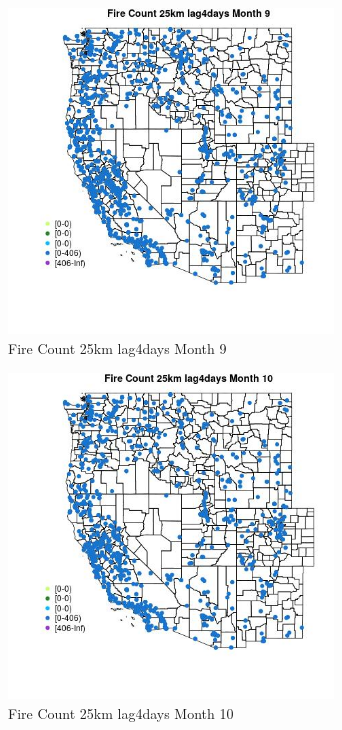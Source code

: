 \begin{figure} 
\centering  
\includegraphics[width=0.77\textwidth]{Code_Outputs/Report_ML_input_PM25_Step4_part_f_de_duplicated_aves_prioritize_24hr_obswNAs_MapObsMo9Fire_Count_25km_lag4days.jpg} 
\caption{\label{fig:Report_ML_input_PM25_Step4_part_f_de_duplicated_aves_prioritize_24hr_obswNAsMapObsMo9Fire_Count_25km_lag4days}Fire Count 25km lag4days Month 9} 
\end{figure} 
 

\begin{figure} 
\centering  
\includegraphics[width=0.77\textwidth]{Code_Outputs/Report_ML_input_PM25_Step4_part_f_de_duplicated_aves_prioritize_24hr_obswNAs_MapObsMo10Fire_Count_25km_lag4days.jpg} 
\caption{\label{fig:Report_ML_input_PM25_Step4_part_f_de_duplicated_aves_prioritize_24hr_obswNAsMapObsMo10Fire_Count_25km_lag4days}Fire Count 25km lag4days Month 10} 
\end{figure} 
 

